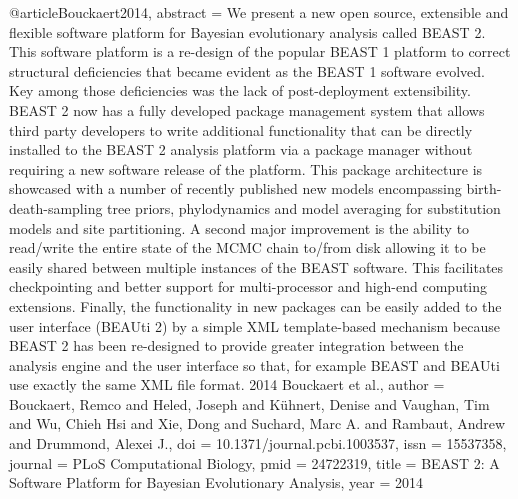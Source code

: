 {{{{{{{@article{Bouckaert2014,
abstract = {We present a new open source, extensible and flexible software platform for Bayesian evolutionary analysis called BEAST 2. This software platform is a re-design of the popular BEAST 1 platform to correct structural deficiencies that became evident as the BEAST 1 software evolved. Key among those deficiencies was the lack of post-deployment extensibility. BEAST 2 now has a fully developed package management system that allows third party developers to write additional functionality that can be directly installed to the BEAST 2 analysis platform via a package manager without requiring a new software release of the platform. This package architecture is showcased with a number of recently published new models encompassing birth-death-sampling tree priors, phylodynamics and model averaging for substitution models and site partitioning. A second major improvement is the ability to read/write the entire state of the MCMC chain to/from disk allowing it to be easily shared between multiple instances of the BEAST software. This facilitates checkpointing and better support for multi-processor and high-end computing extensions. Finally, the functionality in new packages can be easily added to the user interface (BEAUti 2) by a simple XML template-based mechanism because BEAST 2 has been re-designed to provide greater integration between the analysis engine and the user interface so that, for example BEAST and BEAUti use exactly the same XML file format. {\textcopyright} 2014 Bouckaert et al.},
author = {Bouckaert, Remco and Heled, Joseph and K{\"{u}}hnert, Denise and Vaughan, Tim and Wu, Chieh Hsi and Xie, Dong and Suchard, Marc A. and Rambaut, Andrew and Drummond, Alexei J.},
doi = {10.1371/journal.pcbi.1003537},
issn = {15537358},
journal = {PLoS Computational Biology},
pmid = {24722319},
title = {{BEAST 2: A Software Platform for Bayesian Evolutionary Analysis}},
year = {2014}
}


}}}}}}}

